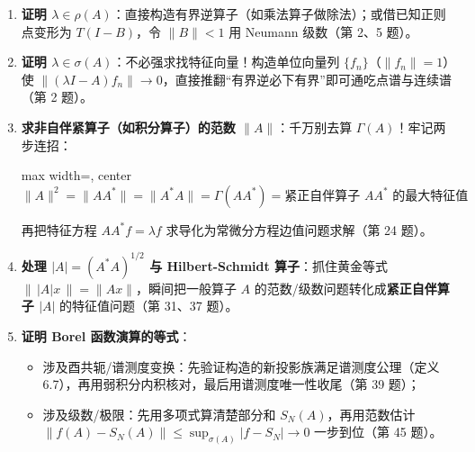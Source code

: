 \documentclass[11pt,a4paper]{article}
\providecommand{\tightlist}{\setlength{\itemsep}{1.8pt}\setlength{\parskip}{0pt}}
\newcommand{\SoftDivider}{%
  \par\vspace{5pt}\noindent\makebox[\linewidth][c]{\textcolor{BorderColor}{\rule{0.38\linewidth}{0.6pt}}}\par\vspace{5pt}%
}
\newcommand{\FitDisplayMath}[1]{%
  \par\vspace{4pt}\noindent
  \begin{adjustbox}{max width=\linewidth, center}
    $\displaystyle #1$
  \end{adjustbox}
  \par\vspace{4pt}%
}
\begin{document}
\begin{enumerate}
\def\labelenumi{\arabic{enumi}.}
\tightlist
\item
  \textbf{证明 \(\lambda \in \rho(A)\)}：直接构造有界逆算子（如乘法算子做除法）；或借已知正则点变形为 \(T(I - B)\)，令 \(\|B\| < 1\) 用 Neumann 级数（第 2、5 题）。
\item
  \textbf{证明 \(\lambda \in \sigma(A)\)}：不必强求找特征向量！构造单位向量列 \(\{f_n\}\)（\(\|f_n\|=1\)）使 \(\|(\lambda I - A)f_n\| \to 0\)，直接推翻``有界逆必下有界''即可通吃点谱与连续谱（第 2 题）。
\item
  \textbf{求非自伴紧算子（如积分算子）的范数 \(\|A\|\)}：千万别去算 \(\Gamma(A)\)！牢记两步连招： 
\FitDisplayMath{\|A\|^2 = \|AA^*\| = \|A^*A\| = \Gamma(AA^*) = \text{紧正自伴算子 } AA^* \text{ 的最大特征值}}
 再把特征方程 \(AA^*f = \lambda f\) 求导化为常微分方程边值问题求解（第 24 题）。
\item
  \textbf{处理 \(|A| = (A^*A)^{1/2}\) 与 Hilbert-Schmidt 算子}：抓住黄金等式 \(\lVert\,|A|x\,\rVert = \lVert Ax\rVert\)，瞬间把一般算子 \(A\) 的范数/级数问题转化成\textbf{紧正自伴算子 \(|A|\)} 的特征值问题（第 31、37 题）。
\item
  \textbf{证明 Borel 函数演算的等式}：

  \begin{itemize}
  \tightlist
  \item
    涉及酉共轭/谱测度变换：先验证构造的新投影族满足谱测度公理（定义 6.7），再用弱积分内积核对，最后用谱测度唯一性收尾（第 39 题）；
  \item
    涉及级数/极限：先用多项式算清楚部分和 \(S_N(A)\)，再用范数估计 \(\|f(A)-S_N(A)\| \le \sup_{\sigma(A)}|f - S_N| \to 0\) 一步到位（第 45 题）。
  \end{itemize}
\end{enumerate}

\SoftDivider
\end{document}
